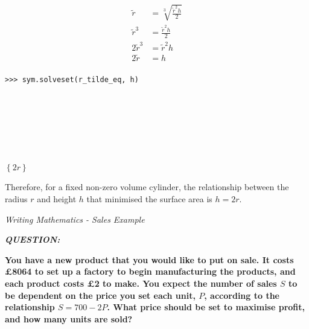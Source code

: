 \documentclass[12pt]{article}
\begin{document}
\begin{minipage}[t]{.37\textwidth} %
\begin{mdframed}[linewidth=0.5mm, backgroundcolor=cyan!10]
\begin{align*}
\tilde{r} &= \sqrt[3]{\frac{\tilde{r}^2 h}{2}} \\
\tilde{r}^3 &= \frac{\tilde{r}^2 h}{2} \\
2\tilde{r}^3 &= \tilde{r}^2 h \\
2\tilde{r} &= h \\
\end{align*}
\end{mdframed}
\end{minipage} %
\begin{minipage}[t]{.63\textwidth} %
\begin{verbatim}
>>> sym.solveset(r_tilde_eq, h)








\end{verbatim}
\vspace{-4.8cm}

\hspace{0.5cm}\begin{minipage}{\textwidth}$\left\{2r\right\}$\end{minipage}
\end{minipage}

\vspace{0.5cm}

\begin{mdframed}[linewidth=0.5mm, backgroundcolor=orange!10]
Therefore, for a fixed non-zero volume cylinder, the relationship between the radius $r$ and height $h$ that minimised the surface area is $h = 2r$.
\end{mdframed}




\newpage

\begin{center}
\LARGE{\textit{Writing Mathematics - Sales Example}}
\end{center}

\vspace{15mm}

\textbf{\textit{QUESTION:}}

\textbf{You have a new product that you would like to put on sale. It costs £8064 to set up a factory to begin manufacturing the products, and each product costs £2 to make. You expect the number of sales $S$ to be dependent on the price you set each unit, $P$, according to the relationship $S = 700 - 2P$. What price should be set to maximise profit, and how many units are sold?}
\end{document}
